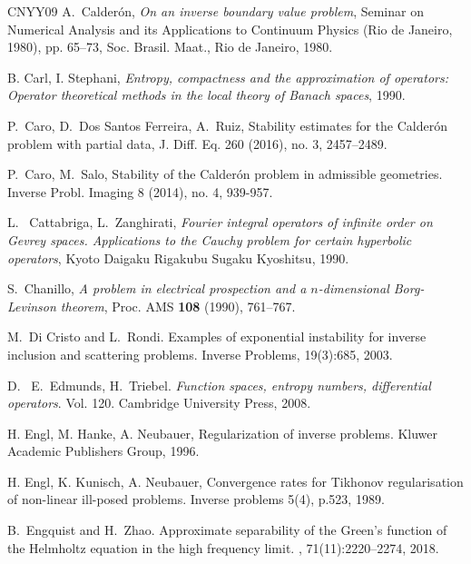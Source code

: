 \documentclass[12pt,twoside]{amsart}
\numberwithin{equation}{section}
\begin{document}
\begin{thebibliography}{CNYY09}
A.\ Calder{\'o}n,
\textit{{On an inverse boundary value problem}},
Seminar on Numerical Analysis and its Applications to Continuum Physics (Rio de Janeiro, 1980), pp.
65--73, Soc. Brasil. Maat., Rio de Janeiro, 1980.

B. Carl, I. Stephani,
\textit{{Entropy, compactness and the approximation of operators: Operator theoretical methods in the local theory of Banach spaces}}, 1990.

P.\ Caro, D.\ Dos Santos Ferreira, A.\ Ruiz, Stability estimates for the Calder\'on problem with partial data, J. Diff. Eq. 260 (2016), no. 3, 2457--2489.

P.\ Caro, M.\ Salo, Stability of the Calder\'on problem in admissible geometries.
Inverse Probl. Imaging 8 (2014), no. 4, 939-957.

L. \ Cattabriga, L.\ Zanghirati,
\textit{{Fourier integral operators of infinite order on Gevrey spaces. Applications to the Cauchy problem for certain hyperbolic operators}}, Kyoto Daigaku Rigakubu Sugaku Kyoshitsu, 1990.



S.\ Chanillo, \textit{{A problem in electrical prospection and a $n$-dimensional Borg-Levinson theorem}}, Proc. AMS {\bf 108} (1990), 761--767.

M.\ Di Cristo and L.\ Rondi. Examples of exponential instability for inverse inclusion and scattering problems. Inverse Problems, 19(3):685, 2003.

D. \ E.\ Edmunds, H.\ Triebel. \textit{{Function spaces, entropy numbers, differential operators}}. Vol. 120. Cambridge University Press, 2008.

H. Engl, M. Hanke, A. Neubauer, Regularization of inverse problems. Kluwer Academic Publishers Group, 1996.

H. Engl, K. Kunisch, A. Neubauer, Convergence rates for Tikhonov regularisation of non-linear ill-posed problems. Inverse problems 5(4), p.523, 1989.



B.\ Engquist and H.\ Zhao.
\newblock Approximate separability of the {G}reen's function of the {H}elmholtz
  equation in the high frequency limit.
,
  71(11):2220--2274, 2018.



\end{thebibliography}
\end{document}

